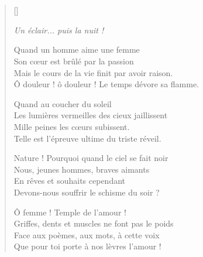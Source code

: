 \section{\hfill}

\settowidth{\versewidth}{Ô douleur ! ô douleur ! Le temps dévore sa flamme.}
\begin{verse}[\versewidth]

\emph{\hspace{15em}Un éclair... puis la nuit ! \\}

Quand un homme aime une femme \\
Son cœur est brûlé par la passion \\
Mais le cours de la vie finit par avoir raison. \\
Ô douleur ! ô douleur ! Le temps dévore sa flamme.

Quand au coucher du soleil \\
Les lumières vermeilles des cieux jaillissent \\
Mille peines les cœurs subissent. \\
Telle est l'épreuve ultime du triste réveil.

Nature ! Pourquoi quand le ciel se fait noir \\
Nous, jeunes hommes, braves aimants \\
En rêves et souhaits cependant \\
Devons-nous souffrir le schisme du soir ?


Ô femme ! Temple de l'amour ! \\
Griffes, dents et muscles ne font pas le poids \\
Face aux poèmes, aux mots, à cette voix \\
Que pour toi porte à nos lèvres l'amour !

\end{verse}

